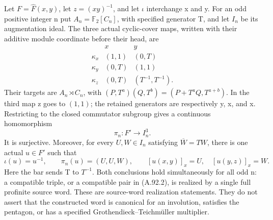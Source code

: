 Let \(F=\widehat F(x,y)\), let \(z=(xy)^{-1}\), and let
\(\iota\) interchange x and y. For an odd positive integer n put
\(A_n=\mathbb F_2[C_n]\), with specified generator T, and let
\(I_n\) be its augmentation ideal. The three actual cyclic-cover
maps, written with their additive module coordinate before their head, are
\[
\begin{array}{c|cc}
 &x&y\\ \hline
 \kappa_x&(1,1)&(0,T)\\
 \kappa_y&(0,T)&(1,1)\\
 \kappa_z&(0,T)&(T^{-1},T^{-1}).
\end{array}
\tag{A.92.1}
\]
Their targets are \(A_n\rtimes C_n\), with
\((P,T^a)(Q,T^b)=(P+T^aQ,T^{a+b})\). In the third map
z goes to \((1,1)\); the retained generators are respectively
y, x, and x. Restricting to the closed commutator subgroup gives
a continuous homomorphism
\[
 \pi_n:F'\longrightarrow I_n^3.
\]
It is surjective. Moreover, for every \(U,W\in I_n\) satisfying
\(\overline W=TW\), there is one actual \(u\in F'\) such that
\[
 \iota(u)=u^{-1},\qquad
 \pi_n(u)=(U,U,W),\qquad
 [u(x,y)]_x=U,\quad [u(y,z)]_x=W.
\tag{A.92.2}
\]
Here the bar sends T to \(T^{-1}\). Both conclusions hold
simultaneously for all odd n: a compatible triple, or a compatible
pair in (A.92.2), is realized by a single full profinite source word.
These are source-word realization statements. They do not assert
that the constructed word is canonical for an involution, satisfies
the pentagon, or has a specified Grothendieck--Teichm\"uller multiplier.

